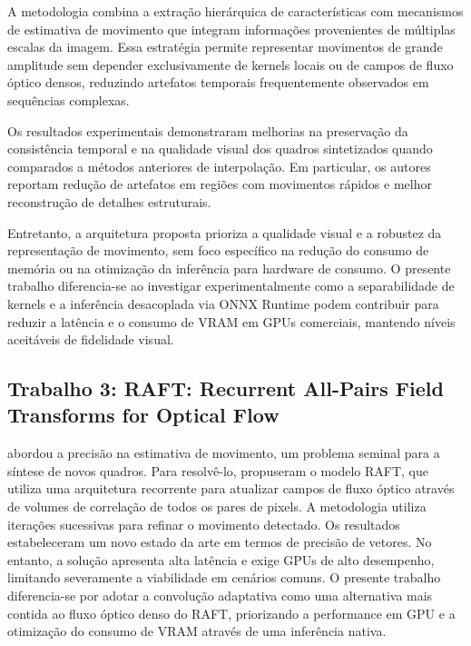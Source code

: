 \documentclass[
    12pt,                %
    openright,           %
    oneside,             %
    a4paper,             %
    english,             %
    brazil               %
]{abntex2}
\begin{document}
A metodologia combina a extração hierárquica de características com mecanismos de estimativa de movimento que integram informações provenientes de múltiplas escalas da imagem. Essa estratégia permite representar movimentos de grande amplitude sem depender exclusivamente de kernels locais ou de campos de fluxo óptico densos, reduzindo artefatos temporais frequentemente observados em sequências complexas.

Os resultados experimentais demonstraram melhorias na preservação da consistência temporal e na qualidade visual dos quadros sintetizados quando comparados a métodos anteriores de interpolação. Em particular, os autores reportam redução de artefatos em regiões com movimentos rápidos e melhor reconstrução de detalhes estruturais.

Entretanto, a arquitetura proposta prioriza a qualidade visual e a robustez da representação de movimento, sem foco específico na redução do consumo de memória ou na otimização da inferência para hardware de consumo. O presente trabalho diferencia-se ao investigar experimentalmente como a separabilidade de kernels e a inferência desacoplada via ONNX Runtime podem contribuir para reduzir a latência e o consumo de VRAM em GPUs comerciais, mantendo níveis aceitáveis de fidelidade visual.


\subsection{Trabalho 3: RAFT: Recurrent All-Pairs Field Transforms for Optical Flow}

 abordou a precisão na estimativa de movimento, um problema seminal para a síntese de novos quadros. Para resolvê-lo, propuseram o modelo RAFT, que utiliza uma arquitetura recorrente para atualizar campos de fluxo óptico através de volumes de correlação de todos os pares de pixels. A metodologia utiliza iterações sucessivas para refinar o movimento detectado. Os resultados estabeleceram um novo estado da arte em termos de precisão de vetores. No entanto, a solução apresenta alta latência e exige GPUs de alto desempenho, limitando severamente a viabilidade em cenários comuns. O presente trabalho diferencia-se por adotar a convolução adaptativa como uma alternativa mais contida ao fluxo óptico denso do RAFT, priorizando a performance em GPU e a otimização do consumo de VRAM através de uma inferência nativa.

\vspace{0.5cm}
\end{document}

